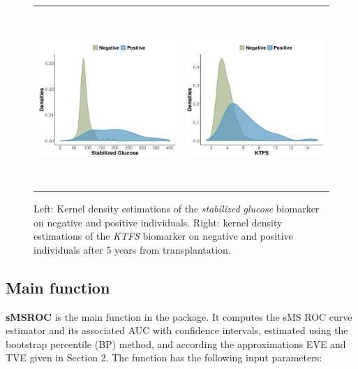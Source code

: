 \begin{figure}[h]
\begin{center}
\begin{tabular}{cc}
\includegraphics[width=7.0cm , height=6.75cm]{figures/FD1.pdf} & \includegraphics[width=7.0cm , height=6.75cm]{figures/FD2.pdf}
\end{tabular}
\caption{{\footnotesize{Left: Kernel density estimations of the {\textit{stabilized glucose}} biomarker on negative and positive individuals. Right: kernel density estimations of the {\textit{KTFS}} biomarker on negative and positive individuals after $5$ years from transplantation.} \label{FE1}}}
\end{center}
\end{figure} 

\subsection{Main function}
\textbf{sMSROC} is the main function in the package. It computes the sMS ROC curve estimator and its associated AUC with confidence intervals, estimated using the bootstrap percentile (BP) method, and according the approximations EVE and TVE given in Section 2. The function has the following input parameters:

